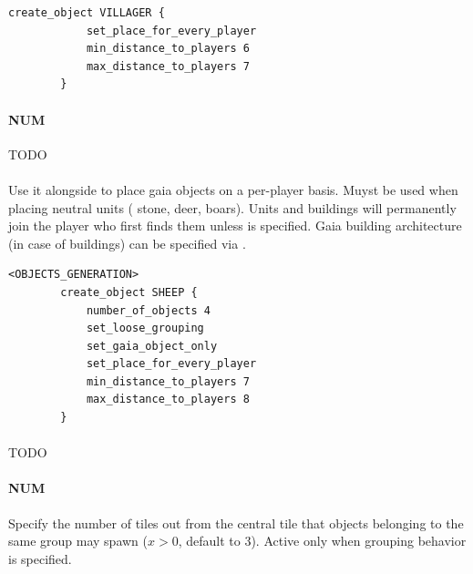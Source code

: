     \begin{lstlisting}[language={rms}, label={lst:setplaceforeveryplayer}, caption={Example showing how you can give to each player a single villager.}]
        create_object VILLAGER {
            set_place_for_every_player
            min_distance_to_players 6
            max_distance_to_players 7
        }
    \end{lstlisting}

    \paragraph{ NUM}

    TODO

    \paragraph{}

    Use it alongside  to place gaia objects on a per-player basis. Muyst be used when placing neutral units (\eg{} stone, deer, boars). Units and buildings will permanently join the player who first finds them unless  is specified. Gaia building architecture (in case of buildings) can be specified via .

    \begin{lstlisting}[language={rms}, caption={Give every player 4 gaia sheep close to their starting town.}]
        <OBJECTS_GENERATION>
        create_object SHEEP {
            number_of_objects 4
            set_loose_grouping
            set_gaia_object_only
            set_place_for_every_player
            min_distance_to_players 7
            max_distance_to_players 8
        }
    \end{lstlisting}

    \paragraph{}

    TODO

    \paragraph{ NUM}

    Specify the number of tiles out from the central tile that objects belonging to the same group may spawn ($x > 0$, default to 3). Active only  when grouping behavior is specified. 

